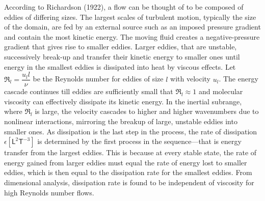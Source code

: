 According to Richardson (1922), a flow can be thought of to be composed of eddies of differing sizes. The largest scales of turbulent motion, typically the size of the domain, are fed by an external source such as an imposed pressure gradient and contain the most kinetic energy. The moving fluid creates a negative-pressure gradient that gives rise to smaller eddies. Larger eddies, that are unstable, successively break-up and transfer their kinetic energy to smaller ones until energy in the smallest eddies is dissipated into heat by viscous effects.
Let $\Re_l=\dfrac{u_l l}{\nu}$ be the Reynolds number for eddies of size $l$ with velocity $u_l$. The energy cascade continues till eddies are sufficiently small that $\Re_l\approx 1$ and molecular viscosity can effectively dissipate its kinetic energy. In the inertial subrange, where $\Re_l$ is large, the velocity cascades to higher and higher wavenumbers due to nonlinear interactions, mirroring the breakup of large, unstable eddies into smaller ones. As dissipation is the last step in the process, the rate of dissipation $\epsilon \left[\textsf{L}^{2} \textsf{T}^{-3} \right]$ is determined by the first process in the sequence---that is energy transfer from the largest eddies. This is because at every stable state, the rate of energy gained from larger eddies must equal the rate of energy lost to smaller eddies, which is then equal to the dissipation rate for the smallest eddies. From dimensional analysis, dissipation rate is found to be
independent of viscosity for high Reynolds number flows.


